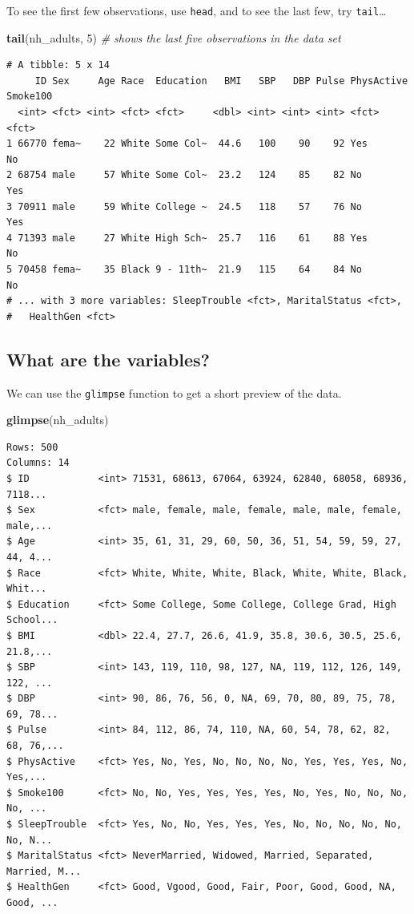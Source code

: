 \documentclass[
]{book}
\newenvironment{Shaded}{\begin{snugshade}}{\end{snugshade}}
\newcommand{\CommentTok}[1]{\textcolor[rgb]{0.56,0.35,0.01}{\textit{#1}}}
\newcommand{\DecValTok}[1]{\textcolor[rgb]{0.00,0.00,0.81}{#1}}
\newcommand{\KeywordTok}[1]{\textcolor[rgb]{0.13,0.29,0.53}{\textbf{#1}}}
\newcommand{\NormalTok}[1]{#1}
\begin{document}
To see the first few observations, use \texttt{head}, and to see the last few, try \texttt{tail}\ldots{}

\begin{Shaded}
\begin{Highlighting}[]
\KeywordTok{tail}\NormalTok{(nh_adults, }\DecValTok{5}\NormalTok{) }\CommentTok{# shows the last five observations in the data set}
\end{Highlighting}
\end{Shaded}

\begin{verbatim}
# A tibble: 5 x 14
     ID Sex     Age Race  Education   BMI   SBP   DBP Pulse PhysActive Smoke100
  <int> <fct> <int> <fct> <fct>     <dbl> <int> <int> <int> <fct>      <fct>   
1 66770 fema~    22 White Some Col~  44.6   100    90    92 Yes        No      
2 68754 male     57 White Some Col~  23.2   124    85    82 No         Yes     
3 70911 male     59 White College ~  24.5   118    57    76 No         Yes     
4 71393 male     27 White High Sch~  25.7   116    61    88 Yes        No      
5 70458 fema~    35 Black 9 - 11th~  21.9   115    64    84 No         No      
# ... with 3 more variables: SleepTrouble <fct>, MaritalStatus <fct>,
#   HealthGen <fct>
\end{verbatim}

\hypertarget{what-are-the-variables}{%
\subsection{What are the variables?}\label{what-are-the-variables}}

We can use the \texttt{glimpse} function to get a short preview of the data.

\begin{Shaded}
\begin{Highlighting}[]
\KeywordTok{glimpse}\NormalTok{(nh_adults)}
\end{Highlighting}
\end{Shaded}

\begin{verbatim}
Rows: 500
Columns: 14
$ ID            <int> 71531, 68613, 67064, 63924, 62840, 68058, 68936, 7118...
$ Sex           <fct> male, female, male, female, male, male, female, male,...
$ Age           <int> 35, 61, 31, 29, 60, 50, 36, 51, 54, 59, 59, 27, 44, 4...
$ Race          <fct> White, White, White, Black, White, White, Black, Whit...
$ Education     <fct> Some College, Some College, College Grad, High School...
$ BMI           <dbl> 22.4, 27.7, 26.6, 41.9, 35.8, 30.6, 30.5, 25.6, 21.8,...
$ SBP           <int> 143, 119, 110, 98, 127, NA, 119, 112, 126, 149, 122, ...
$ DBP           <int> 90, 86, 76, 56, 0, NA, 69, 70, 80, 89, 75, 78, 69, 78...
$ Pulse         <int> 84, 112, 86, 74, 110, NA, 60, 54, 78, 62, 82, 68, 76,...
$ PhysActive    <fct> Yes, No, Yes, No, No, No, No, Yes, Yes, Yes, No, Yes,...
$ Smoke100      <fct> No, No, Yes, Yes, Yes, Yes, No, Yes, No, No, No, No, ...
$ SleepTrouble  <fct> Yes, No, No, Yes, Yes, Yes, No, No, No, No, No, No, N...
$ MaritalStatus <fct> NeverMarried, Widowed, Married, Separated, Married, M...
$ HealthGen     <fct> Good, Vgood, Good, Fair, Poor, Good, Good, NA, Good, ...
\end{verbatim}
\end{document}
